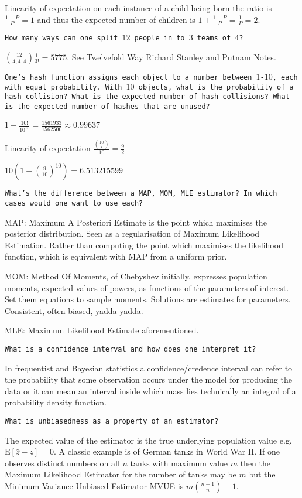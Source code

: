 Linearity of expectation on each instance of a child being born the ratio is $\frac{1-P}{P}=\boxed{1}$ and thus the expected number of children is $1+\frac{1-P}{P}=\frac{1}{P}=\boxed{2}$.

\texttt{How many ways can one split $12$ people in to $3$ teams of $4$?}

$ \binom{12}{4,4,4} \frac{1}{3!} = \boxed{5775}$. See Twelvefold Way Richard Stanley and Putnam Notes.

\texttt{One's hash function assigns each object to a number between $1$-$10$, each with equal probability. With $10$ objects, what is the probability of a hash collision? What is the expected number of hash collisions? What is the expected number of hashes that are unused?}

$1-\frac{10!}{10^{10}} = \boxed{\frac{1561933}{1562500}}\approx 0.99637$

Linearity of expectation $\frac{\binom{10}{2}}{10}=\boxed{\frac{9}{2}}$

$10\left(1-\left( \frac{9}{10} \right)^{10} \right)=\boxed{6.513215599}$

\texttt{What's the difference between a MAP, MOM, MLE estimator? In which cases would one want to use each?}

MAP: Maximum A Posteriori Estimate is the point which maximises the posterior distribution. Seen as a regularisation of Maximum Likelihood Estimation. Rather than computing the point which maximises the likelihood function, which is equivalent with MAP from a uniform prior.

MOM: Method Of Moments, of Chebyshev initially, expresses population moments, expected values of powers, as functions of the parameters of interest. Set them equations to sample moments. Solutions are estimates for parameters. Consistent, often biased, yadda yadda.

MLE: Maximum Likelihood Estimate aforementioned.

\texttt{What is a confidence interval and how does one interpret it?}

In frequentist and Bayesian statistics a confidence/credence interval can refer to the probability that some observation occurs under the model for producing the data or it can mean an interval inside which mass lies technically an integral of a probability density function.

\texttt{What is unbiasedness as a property of an estimator?}

The expected value of the estimator is the true underlying population value e.g. $\text{E}[\hat{z}-z] = 0$. A classic example is of German tanks in World War II. If one observes distinct numbers on all $n$ tanks with maximum value $m$ then the Maximum Likelihood Estimator for the number of tanks may be $m$ but the Minimum Variance Unbiased Estimator MVUE is $m \left ( \frac{n+1}{n} \right ) - 1$.


